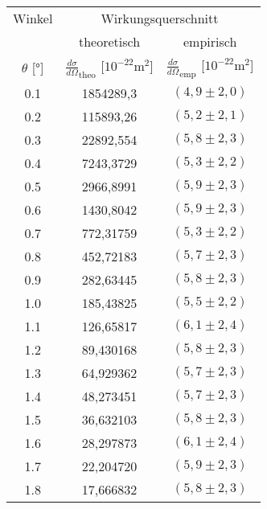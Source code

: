 \begin{table}
[H]
  \center
\begin{tabular}{c|c|c}
\toprule

Winkel & \multicolumn{2}{c}{Wirkungsquerschnitt} \\
       &
 theoretisch & empirisch \\
$\theta$ [°]
& $\frac{d\sigma}{d\Omega}_{\text{theo}}$ [$10^{-22}\text{m}^2$]
& $\frac{d\sigma}{d\Omega}_{\text{emp}}$ [$10^{-22}\text{m}^2$] \\
\midrule
 0.1 & 1854289,3 & $(4,9\pm2,0)$\\

 0.2 & 115893,26 & $(5,2\pm2,1)$\\

 0.3 & 22892,554 & $(5,8\pm2,3)$\\

 0.4 & 7243,3729 & $(5,3\pm2,2)$\\

 0.5 & 2966,8991 & $(5,9\pm2,3)$\\

 0.6 & 1430,8042 & $(5,9\pm2,3)$\\

 0.7 & 772,31759 & $(5,3\pm2,2)$\\

 0.8 & 452,72183 & $(5,7\pm2,3)$\\

 0.9 & 282,63445 & $(5,8\pm2,3)$\\

 1.0 & 185,43825 & $(5,5\pm2,2)$\\

 1.1 & 126,65817 & $(6,1\pm2,4)$\\

 1.2 & 89,430168 & $(5,8\pm2,3)$\\

 1.3 & 64,929362 & $(5,7\pm2,3)$\\

 1.4 & 48,273451 & $(5,7\pm2,3)$\\

 1.5 & 36,632103 & $(5,8\pm2,3)$\\

 1.6 & 28,297873 & $(6,1\pm2,4)$\\

 1.7 & 22,204720 & $(5,9\pm2,3)$\\

 1.8 & 17,666832 & $(5,8\pm2,3)$\\


\end{tabular}
\end{table}
